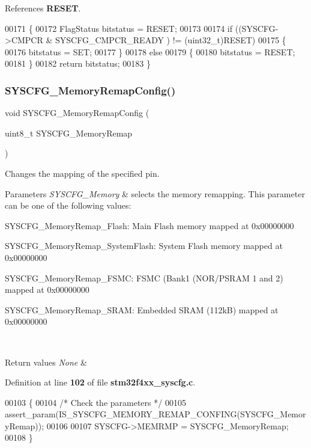 References \textbf{ R\+E\+S\+ET}.


\begin{DoxyCode}
00171 \{
00172   FlagStatus bitstatus = RESET;
00173     
00174   \textcolor{keywordflow}{if} ((SYSCFG->CMPCR & SYSCFG_CMPCR_READY ) != (uint32\_t)RESET)
00175   \{
00176     bitstatus = SET;
00177   \}
00178   \textcolor{keywordflow}{else}
00179   \{
00180     bitstatus = RESET;
00181   \}
00182   \textcolor{keywordflow}{return} bitstatus;
00183 \}
\end{DoxyCode}
\mbox{\label{group__SYSCFG_ga09a5712f6c66ba5f0e0eeba30bc1e20d}} 
\subsubsection{S\+Y\+S\+C\+F\+G\+\_\+\+Memory\+Remap\+Config()}
{\footnotesize\ttfamily void S\+Y\+S\+C\+F\+G\+\_\+\+Memory\+Remap\+Config (\begin{DoxyParamCaption}\item[{uint8\+\_\+t}]{S\+Y\+S\+C\+F\+G\+\_\+\+Memory\+Remap }\end{DoxyParamCaption})}



Changes the mapping of the specified pin. 


\begin{DoxyParams}{Parameters}
{\em S\+Y\+S\+C\+F\+G\+\_\+\+Memory} & selects the memory remapping. This parameter can be one of the following values\+: \begin{DoxyItemize}
\item S\+Y\+S\+C\+F\+G\+\_\+\+Memory\+Remap\+\_\+\+Flash\+: Main Flash memory mapped at 0x00000000 \item S\+Y\+S\+C\+F\+G\+\_\+\+Memory\+Remap\+\_\+\+System\+Flash\+: System Flash memory mapped at 0x00000000 \item S\+Y\+S\+C\+F\+G\+\_\+\+Memory\+Remap\+\_\+\+F\+S\+MC\+: F\+S\+MC (Bank1 (N\+O\+R/\+P\+S\+R\+AM 1 and 2) mapped at 0x00000000 \item S\+Y\+S\+C\+F\+G\+\_\+\+Memory\+Remap\+\_\+\+S\+R\+AM\+: Embedded S\+R\+AM (112kB) mapped at 0x00000000 \end{DoxyItemize}
\\
\hline
\end{DoxyParams}

\begin{DoxyRetVals}{Return values}
{\em None} & \\
\hline
\end{DoxyRetVals}


Definition at line \textbf{ 102} of file \textbf{ stm32f4xx\+\_\+syscfg.\+c}.


\begin{DoxyCode}
00103 \{
00104   \textcolor{comment}{/* Check the parameters */}
00105   assert_param(IS_SYSCFG_MEMORY_REMAP_CONFING(SYSCFG\_MemoryRemap));
00106 
00107   SYSCFG->MEMRMP = SYSCFG\_MemoryRemap;
00108 \}
\end{DoxyCode}
